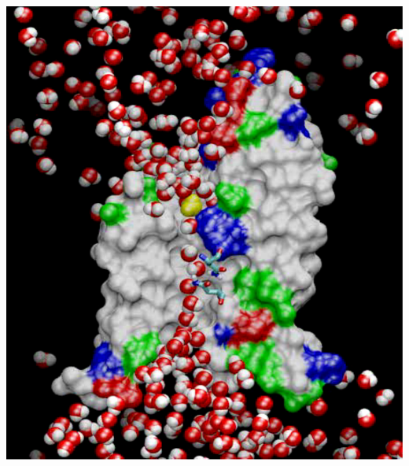 \begin{frame}[t]
\begin{columns}
  \begin{center} \includegraphics[width=\textwidth]{figures/namd.pdf} \end{center}
  \vfill
  \end{columns}
\end{frame}

